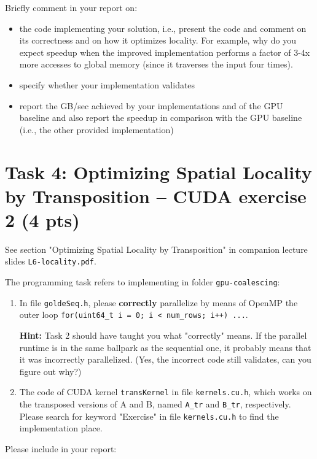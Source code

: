 \documentclass{article}
\begin{document}
\begin{itemize}
Briefly comment in your report on:

\begin{itemize}
    \item the code implementing your solution, i.e., present
    the code and comment on its correctness and on
    how it optimizes locality. For example, why do
    you expect speedup when the improved implementation
    performs a factor of 3-4x more accesses to global memory
    (since it traverses the input four times).
    \item specify whether your implementation validates
    \item report the GB/sec achieved by your implementations and of the GPU baseline
    and also report the speedup in comparison with the GPU baseline
    (i.e., the other provided implementation)
\end{itemize}

\section{Task 4: Optimizing Spatial Locality by Transposition -- CUDA exercise 2 (4 pts)}

See section "Optimizing Spatial Locality by Transposition" in companion lecture slides \texttt{L6-locality.pdf}.

The programming task refers to implementing in folder \texttt{gpu-coalescing}: 

\begin{enumerate}
    \item In file \texttt{goldeSeq.h}, please \textbf{correctly} parallelize by means of OpenMP the outer loop \texttt{for(uint64\_t i = 0; i < num\_rows; i++) ...}. 
    
    \textbf{Hint:} Task 2 should have taught you what "correctly" means. If the parallel runtime is in the same ballpark as the sequential one, it probably means that it was incorrectly parallelized. (Yes, the incorrect code still validates, can you figure out why?)
    
    \item The code of CUDA kernel \texttt{transKernel} in file \texttt{kernels.cu.h}, which works on the transposed versions of A and B, named \texttt{A\_tr} and \texttt{B\_tr}, respectively. Please search for keyword "Exercise" in file \texttt{kernels.cu.h} to find the implementation place.
\end{enumerate}

Please include in your report:


\end{itemize}
\end{document}
